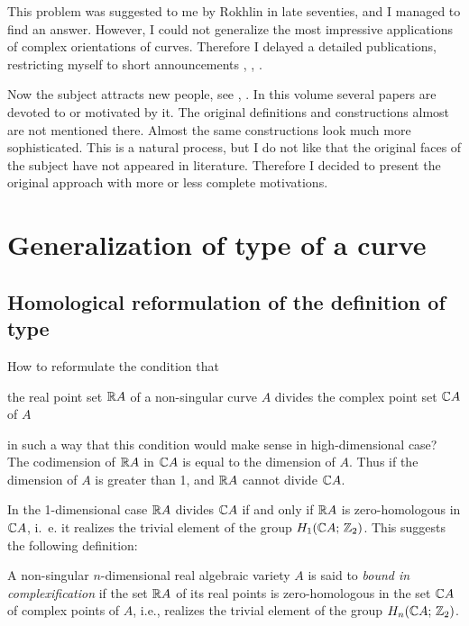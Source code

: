 \documentclass{article}
\numberwithin{equation}{section}
\begin{document}
This problem was suggested to me by Rokhlin in late seventies, and I
managed to find an answer. However, I could not generalize the most
impressive applications of complex orientations of curves. Therefore I
delayed a detailed publications, restricting myself to short
announcements \cite{V2}, \cite{V3}, \cite{V4}.

Now the subject attracts new people, see \cite{Ka}, \cite{D}. In this
volume several papers are devoted to or motivated by it. The original
definitions and constructions almost are not mentioned there. Almost
the same constructions look much more sophisticated. This is a natural
process, but I do not like that the original faces of the subject have
not appeared in literature.  Therefore I decided to present the
original approach with more or less complete motivations.


\section{Generalization of type of a curve}\label{s1}

\subsection{Homological reformulation of the definition of type}\label{s1.1}
How to reformulate the condition that\\
\begin{center}
\parbox{4.3in}{
the real point set $\mathbb R A$ of a non-singular curve $A$ divides the complex
point set $\mathbb C A$ of $A$}
\end{center}
in such a way that this condition would make sense in high-dimensional case?
The codimension of $\mathbb R A$ in $\mathbb C A$ is equal to the dimension of $A$. Thus if
the dimension of $A$ is greater than 1, and $\mathbb R A$ cannot divide
$\mathbb C A$.

In the 1-dimensional case $\mathbb R A$ divides $\mathbb C A$ if and only if $\mathbb R A$ is
zero-homologous in $\mathbb C A$, i.~e. it realizes the trivial element of the
group $H_1(\mathbb C A;\,\mathbb Z_2)$. This suggests the following definition:

A non-singular $n$-dimensional real algebraic variety $A$ is said to
{\it bound in complexification\/} if the set $\mathbb R A$ of its real points is
zero-homologous in the set $\mathbb C A$ of complex points of $A$,
i.e., realizes the trivial element of the group $H_n(\mathbb C A;\,\mathbb Z_2)$.
\end{document}
